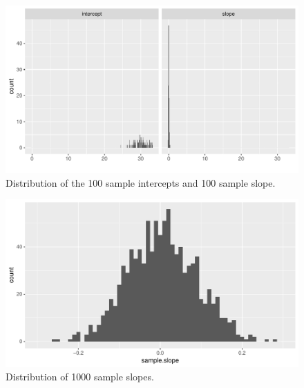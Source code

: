 \documentclass[]{report}\usepackage[]{graphicx}\usepackage[]{color}
\makeatletter
\def\maxwidth{ %
  \ifdim\Gin@nat@width>\linewidth
    \linewidth
  \else
    \Gin@nat@width
  \fi
}
\newenvironment{knitrout}{}{} %
\makeatother
\begin{document}
\begin{knitrout}
\color{fgcolor}\begin{figure}

{\centering \includegraphics[width=\maxwidth]{figure/inf_3b-1} 

}

\caption[Distribution of the 100 sample intercepts and 100 sample slope]{Distribution of the 100 sample intercepts and 100 sample slope.}\label{fig:inf_3b}
\end{figure}


\end{knitrout}




\begin{knitrout}
\color{fgcolor}\begin{figure}

{\centering \includegraphics[width=\maxwidth]{figure/inf_5-1} 

}

\caption[Distribution of 1000 sample slopes]{Distribution of 1000 sample slopes.}\label{fig:inf_5}
\end{figure}


\end{knitrout}
\end{document}
